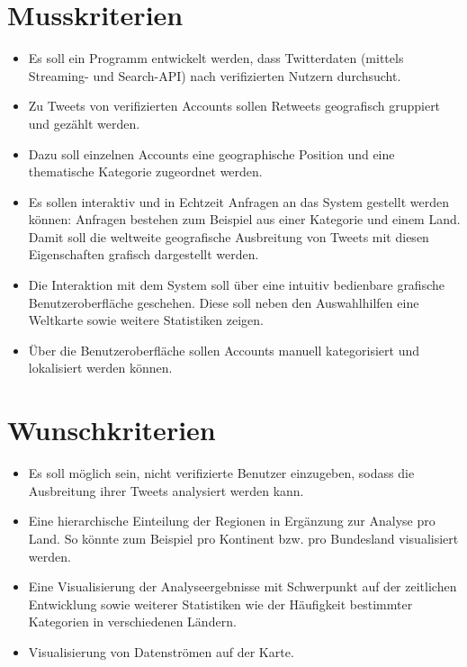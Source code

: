 
\section{Musskriterien}
\begin{itemize}
	\item Es soll ein Programm entwickelt werden, dass Twitterdaten (mittels Streaming- und Search-API) nach verifizierten Nutzern durchsucht.
	\item Zu Tweets von verifizierten Accounts sollen Retweets geografisch gruppiert und gezählt werden.
	\item Dazu soll einzelnen Accounts eine geographische Position und eine thematische Kategorie zugeordnet werden.
	\item Es sollen interaktiv und in Echtzeit Anfragen an das System gestellt werden können: Anfragen bestehen zum Beispiel aus einer Kategorie und einem Land. Damit soll die weltweite geografische Ausbreitung von Tweets mit diesen Eigenschaften grafisch dargestellt werden.
	\item Die Interaktion mit dem System soll über eine intuitiv bedienbare grafische Benutzeroberfläche geschehen. Diese soll neben den Auswahlhilfen eine Weltkarte sowie weitere Statistiken zeigen.
	\item Über die Benutzeroberfläche sollen Accounts manuell kategorisiert und lokalisiert werden können.
\end{itemize}

\section{Wunschkriterien}
\begin{itemize}
	\item Es soll möglich sein, nicht verifizierte Benutzer einzugeben, sodass die Ausbreitung ihrer Tweets analysiert werden kann.
	\item Eine hierarchische Einteilung der Regionen in Ergänzung zur Analyse pro Land. So könnte zum Beispiel pro Kontinent bzw. pro Bundesland visualisiert werden.
	\item Eine Visualisierung der Analyseergebnisse mit Schwerpunkt auf der zeitlichen Entwicklung sowie weiterer Statistiken wie der Häufigkeit bestimmter Kategorien in verschiedenen Ländern.
	\item Visualisierung von Datenströmen auf der Karte.
\end{itemize}

